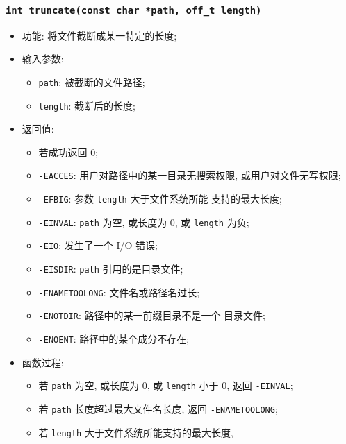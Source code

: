 \documentclass[nofonts, titlepage]{ctexart}
\begin{document}
  \subsubsection[\texttt{truncate}]{\texttt{int truncate(const char *path,
      off\_t length)}}
      \begin{itemize}
            \item 功能: 将文件截断成某一特定的长度;
            \item 输入参数:
            \begin{itemize}
                \item \texttt{path}: 被截断的文件路径;
                \item \texttt{length}: 截断后的长度;
            \end{itemize}
            \item 返回值:
            \begin{itemize}
                \item 若成功返回 0;
                \item \verb'-EACCES': 用户对路径中的某一目录无搜索权限,
                    或用户对文件无写权限;
                \item \verb'-EFBIG': 参数 \verb'length' 大于文件系统所能
                    支持的最大长度;
                \item \verb'-EINVAL': \verb'path' 为空, 或长度为 0, 或
                    \verb'length' 为负;
                \item \verb'-EIO': 发生了一个 I/O 错误;
                \item \verb'-EISDIR': \verb'path' 引用的是目录文件;
                \item \verb'-ENAMETOOLONG': 文件名或路径名过长;
                \item \verb'-ENOTDIR': 路径中的某一前缀目录不是一个 
                    目录文件;
                \item \verb'-ENOENT': 路径中的某个成分不存在;
            \end{itemize}
            \item 函数过程:
            \begin{itemize}
                \item 若 \verb'path' 为空, 或长度为 0, 或 \verb'length'
                    小于 0, 返回 \verb'-EINVAL';
                \item 若 \verb'path' 长度超过最大文件名长度, 返回 
                    \verb'-ENAMETOOLONG';
                \item 若 \verb'length' 大于文件系统所能支持的最大长度,

\end{itemize}
\end{itemize}
\end{document}
